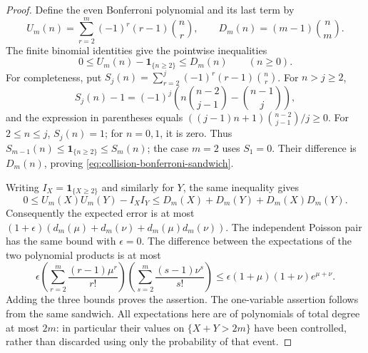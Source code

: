 \begin{proof}
Define the even Bonferroni polynomial and its last term by
\[
 U_m(n)=\sum_{r=2}^{m}(-1)^r(r-1)\binom nr,
 \qquad D_m(n)=(m-1)\binom nm.
\]
The finite binomial identities give the pointwise inequalities
\begin{equation}
\label{eq:collision-bonferroni-sandwich}
 0\le U_m(n)-\mathbf 1_{\{n\ge2\}}\le D_m(n)
 \qquad(n\ge0).
\end{equation}
For completeness, put $S_j(n)=\sum_{r=2}^{j}(-1)^r(r-1)\binom nr$.
For $n>j\ge2$,
\[
 S_j(n)-1=(-1)^j
 \left(n\binom{n-2}{j-1}-\binom{n-1}{j}\right),
\]
and the expression in parentheses equals
$((j-1)n+1)\binom{n-2}{j-1}/j\ge0$.
For $2\le n\le j$, $S_j(n)=1$; for $n=0,1$, it is zero.
Thus $S_{m-1}(n)\le\mathbf 1_{\{n\ge2\}}\le S_m(n)$; the case $m=2$
uses $S_1=0$. Their difference is $D_m(n)$, proving
\eqref{eq:collision-bonferroni-sandwich}.

Writing $I_X=\mathbf 1_{\{X\ge2\}}$ and similarly for $Y$, the same inequality gives
\[
 0\le U_m(X)U_m(Y)-I_XI_Y
 \le D_m(X)+D_m(Y)+D_m(X)D_m(Y).
\]
Consequently the expected error is at most
$(1+\epsilon)(d_m(\mu)+d_m(\nu)+d_m(\mu)d_m(\nu))$.
The independent Poisson pair has the same bound with $\epsilon=0$.
The difference between the expectations of the two polynomial products is
at most
\[
 \epsilon\left(\sum_{r=2}^{m}\frac{(r-1)\mu^r}{r!}\right)
 \left(\sum_{s=2}^{m}\frac{(s-1)\nu^s}{s!}\right)
 \le\epsilon(1+\mu)(1+\nu)e^{\mu+\nu}.
\]
Adding the three bounds proves the assertion. The one-variable assertion
follows from the same sandwich. All expectations here are of polynomials of
total degree at most $2m$: in particular their values on $\{X+Y>2m\}$ have
been controlled, rather than discarded using only the probability of that event.
\end{proof}

